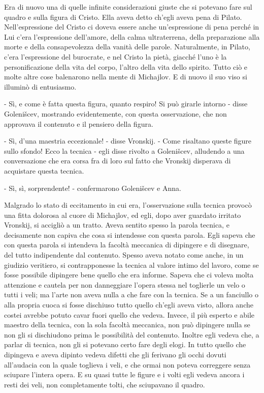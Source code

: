 Era di nuovo una di quelle infinite considerazioni giuste che si potevano fare sul quadro e sulla figura di Cristo. Ella aveva detto ch'egli aveva pena di Pilato. Nell'espressione del Cristo ci doveva essere anche un'espressione di pena perché in Lui c'era l'espressione dell'amore, della calma ultraterrena, della preparazione alla morte e della consapevolezza della vanità delle parole. Naturalmente, in Pilato, c'era l'espressione del burocrate, e nel Cristo la pietà, giacché l'uno è la personificazione della vita del corpo, l'altro della vita dello spirito. Tutto ciò e molte altre cose balenarono nella mente di Michajlov. E di nuovo il suo viso si illuminò di entusiasmo. 

- Sì, e come è fatta questa figura, quanto respiro! Si può girarle intorno - disse Golenišcev, mostrando evidentemente, con questa osservazione, che non approvava il contenuto e il pensiero della figura. 

- Sì, d'una maestria eccezionale! - disse Vronskij. - Come risaltano queste figure sullo sfondo! Ecco la tecnica - egli disse rivolto a Golenišcev, alludendo a una conversazione che era corsa fra di loro sul fatto che Vronskij disperava di acquistare questa tecnica. 

- Sì, sì, sorprendente! - confermarono Golenišcev e Anna. 

Malgrado lo stato di eccitamento in cui era, l'osservazione sulla tecnica provocò una fitta dolorosa al cuore di Michajlov, ed egli, dopo aver guardato irritato Vronskij, si accigliò a un tratto. Aveva sentito spesso la parola tecnica, e decisamente non capiva che cosa si intendesse con questa parola. Egli sapeva che con questa parola si intendeva la facoltà meccanica di dipingere e di disegnare, del tutto indipendente dal contenuto. Spesso aveva notato come anche, in un giudizio veritiero, si contrapponesse la tecnica al valore intimo del lavoro, come se fosse possibile dipingere bene quello che era informe. Sapeva che ci voleva molta attenzione e cautela per non danneggiare l'opera stessa nel toglierle un velo o tutti i veli; ma l'arte non aveva nulla a che fare con la tecnica. Se a un fanciullo o alla propria cuoca si fosse dischiuso tutto quello ch'egli aveva visto, allora anche costei avrebbe potuto cavar fuori quello che vedeva. Invece, il più esperto e abile maestro della tecnica, con la sola facoltà meccanica, non può dipingere nulla se non gli si dischiudono prima le possibilità del contenuto. Inoltre egli vedeva che, a parlar di tecnica, non gli si potevano certo fare degli elogi. In tutto quello che dipingeva e aveva dipinto vedeva difetti che gli ferivano gli occhi dovuti all'audacia con la quale toglieva i veli, e che ormai non poteva correggere senza sciupare l'intera opera. E su quasi tutte le figure e i volti egli vedeva ancora i resti dei veli, non completamente tolti, che sciupavano il quadro. 

